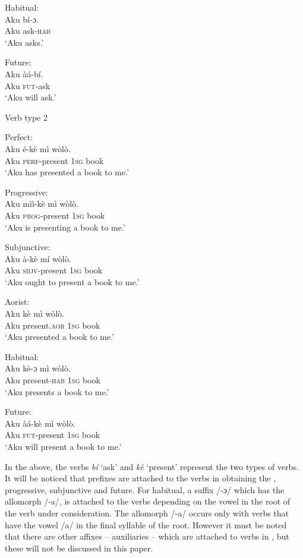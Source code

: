 \documentclass[output=paper,newtxmath,modfonts,nonflat,hidelinks]{langsci/langscibook}
\begin{document}
\ex Habitual:\\
\gll Aku bí-ɔ.\\
Aku ask-\textsc{hab}\\
\glt `Aku asks.'

\ex Future:\\
\gll Aku àá-bí.\\
Aku \textsc{fut}-ask\\
\glt `Aku will ask.'
\z
\z
 

\newpage 
Verb type 2



\ea \label{ex:ollennu:46} 
\ea
Perfect:\\
\gll Aku é-kè mì wòlò.\\
Aku \textsc{perf}-present 1\textsc{sg} book\\
\glt 	`Aku has presented a book to me.'

\ex Progressive:\\
\gll Aku mìì-kè mì wòlò.\\
Aku \textsc{prog}-present 1\textsc{sg} book\\
\glt `Aku is presenting a book to me.'

\ex Subjunctive:\\
\gll Aku à-kè mí wòlò.\\
Aku \textsc{sbjv}-present 1\textsc{sg} book\\
\glt `Aku ought to present a book to me.'
\z
\z


\ea Aorist:\\
\ea
\gll Aku kè mì wòlò.\\
Aku present.\textsc{aor} 1\textsc{sg} book\\
\glt `Aku presented a book to me.'

\ex Habitual:\\
\gll Aku kè-ɔ mì wòlò.\\
Aku present-\textsc{hab} 1\textsc{sg} book\\
\glt `Aku presents a book to me.'

\ex Future:\\
\gll Aku àá-kè mì wòlò.\\
Aku \textsc{fut}-present 1\textsc{sg} book\\
\glt `Aku will present a book to me.'
\z
\z 

In the above, the verbs  \textit{bí} `ask' and \textit{kè} `present' represent the two types of verbs. It will be noticed that prefixes are attached to the verbs in obtaining the , progressive, subjunctive and future. For habitual, a suffix /-ɔ/ which has the allomorph /-a/, is attached to the verbs depending on the vowel in the root of the verb under consideration. The allomorph /-a/ occurs only with verbs that have the vowel /a/ in the final syllable of the root. However it must be noted that there are other affixes -- auxiliaries -- which are attached to verbs in , but these will not be discussed in this paper.
\end{document}
